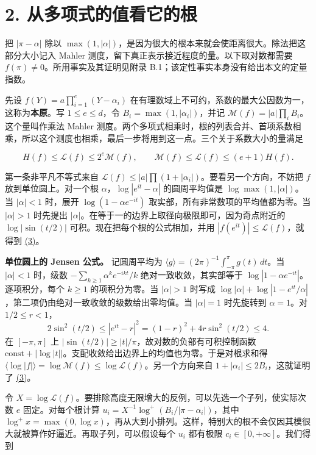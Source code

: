 \documentclass[11pt,a4paper]{article}
\begin{document}
\section{2. 从多项式的值看它的根}\label{ux4eceux591aux9879ux5f0fux7684ux503cux770bux5b83ux7684ux6839}

把 \(|\pi-\alpha|\) 除以 \(\max(1,|\alpha|)\)，是因为很大的根本来就会使距离很大。除法把这部分大小记入 Mahler 测度，留下真正表示接近程度的量。以下取对数都需要 \(f(\pi)\ne0\)。所用事实及其证明见附录 B.1；该定性事实本身没有给出本文的定量指数。

先设 \(f(Y)=a\prod_{i=1}^{e}(Y-\alpha_i)\) 在有理数域上不可约，系数的最大公因数为一，这称为\textbf{本原}。写 \(1\le e\le d\)，令 \(B_i=\max(1,|\alpha_i|)\)，并记 \(\mathcal M(f)=|a|\prod_iB_i\)。这个量叫作乘法 Mahler 测度。两个多项式相乘时，根的列表合并、首项系数相乘，所以这个测度也相乘，最后一步将用到这一点。三个关于系数大小的量满足

\[
 H(f)\le \mathcal L(f)\le 2^e\mathcal M(f),\qquad
 \mathcal M(f)\le\mathcal L(f)\le(e+1)H(f).                             \tag{3}\label{eq:3}
\]

第一条非平凡不等式来自 \(\mathcal L(f)\le |a|\prod(1+|\alpha_i|)\)。要看另一个方向，不妨把 \(f\) 放到单位圆上。对一个根 \(\alpha\)，\(\log|e^{it}-\alpha|\) 的圆周平均值是 \(\log\max(1,|\alpha|)\)。当 \(|\alpha|<1\) 时，展开 \(\log(1-\alpha e^{-it})\) 取实部，所有非常数项的平均值都为零。当 \(|\alpha|>1\) 时先提出 \(|\alpha|\)。在等于一的边界上取径向极限即可，因为奇点附近的 \(\log|\sin(t/2)|\) 可积。现在把每个根的公式相加，并用 \(|f(e^{it})|\le\mathcal L(f)\)，就得到 \hyperref[eq:3]{(3)}。

\textbf{单位圆上的 Jensen 公式。} 记圆周平均为 \(\langle g\rangle=(2\pi)^{-1}\int_{-\pi}^{\pi}g(t)\,dt\)。当 \(|\alpha|<1\) 时，级数 \(-\sum_{k\ge1}\alpha^ke^{-ikt}/k\) 绝对一致收敛，其实部等于 \(\log|1-\alpha e^{-it}|\)。逐项积分，每个 \(k\ge1\) 的项积分为零。当 \(|\alpha|>1\) 时写成 \(\log|\alpha|+\log|1-e^{it}/\alpha|\)，第二项仍由绝对一致收敛的级数给出零均值。当 \(|\alpha|=1\) 时先旋转到 \(\alpha=1\)。对 \(1/2\le r<1\)， \[
 2\sin^2(t/2)\le |e^{it}-r|^2=(1-r)^2+4r\sin^2(t/2)\le4 .
\] 在 \([-\pi,\pi]\) 上 \(|\sin(t/2)|\ge |t|/\pi\)，故对数的负部有可积控制函数 \(\mathrm{const}+|\log|t||\)。支配收敛给出边界上的均值也为零。于是对根求和得 \(\langle\log|f|\rangle=\log\mathcal M(f)\le\log\mathcal L(f)\)。另一个方向来自 \(1+|\alpha_i|\le2B_i\)，这就证明了 \hyperref[eq:3]{(3)}。

令 \(X=\log\mathcal L(f)\)。要排除高度无限增大的反例，可以先选一个子列，使实际次数 \(e\) 固定。对每个根计算 \(u_i=X^{-1}\log^+(B_i/|\pi-\alpha_i|)\)，其中 \(\log^+x=\max(0,\log x)\)，再从大到小排列。这样，特别大的根不会仅因其模很大就被算作好逼近。再取子列，可以假设每个 \(u_i\) 都有极限 \(c_i\in[0,+\infty]\)。我们得到
\end{document}
